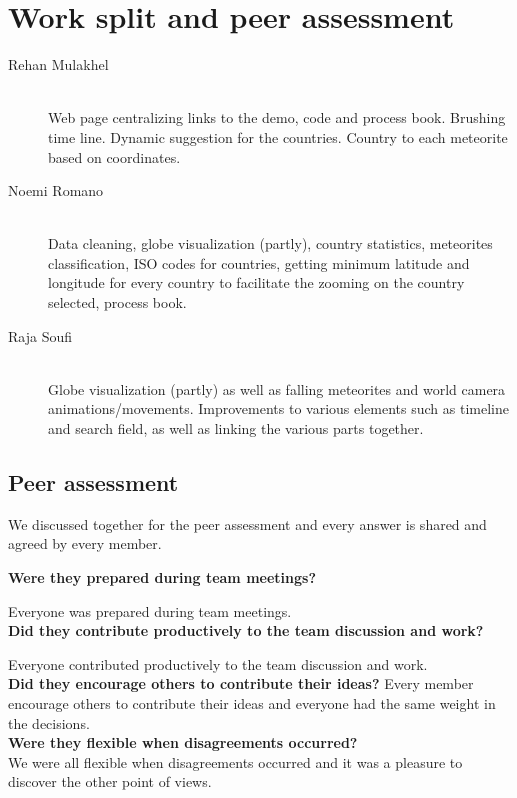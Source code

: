 \documentclass[10pt,conference,compsocconf]{IEEEtran}
\begin{document}
\section{Work split and peer assessment}
\label{sec:work_split}

\begin{description}
\item[Rehan Mulakhel] \ \\
  Web page centralizing links to the demo, code and process book. Brushing time line. Dynamic suggestion for the countries. Country to each meteorite based on coordinates. 
\item[Noemi Romano] \ \\
  Data cleaning, globe visualization (partly), country statistics, meteorites classification, ISO codes for countries, getting minimum latitude and longitude for every country to facilitate the zooming on the country selected, process book.  
\item[Raja Soufi] \ \\
  Globe visualization (partly) as well as falling meteorites and world camera animations/movements.
  Improvements to various elements such as timeline and search field, as well as linking the various parts together.
\end{description}

\subsection{Peer assessment}

We discussed together for the peer assessment and every answer is shared and agreed by every member. 

\medskip

\textbf{Were they prepared during team meetings? }

Everyone was prepared during team meetings. \\

\textbf{Did they contribute productively to the team discussion and work?}

Everyone contributed productively to the team discussion and work. \\

\textbf{Did they encourage others to contribute their ideas?
}
Every member encourage others to contribute their ideas and everyone had the same weight in the decisions. \\

\textbf{
Were they flexible when disagreements occurred?}\\
We were all flexible when disagreements occurred and it was a pleasure to discover the other point of views. 



\end{document}
